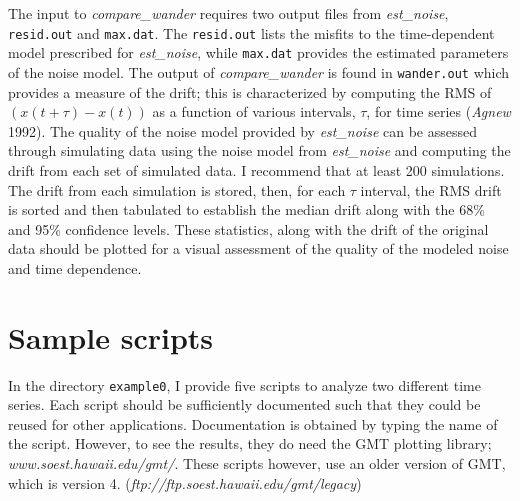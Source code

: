 \documentclass[12pt]{amsart}
\begin{document}
The input to  \textit{compare\_wander} requires two output files from \textit{est\_noise}, \texttt{resid.out} and \texttt{max.dat}.
The \texttt{resid.out} lists the misfits to the time-dependent model prescribed for \textit{est\_noise}, while \texttt{max.dat}
provides the estimated parameters of the noise model.  The output of \textit{compare\_wander} is found in \texttt{wander.out}
which provides a measure of the drift; this is characterized by computing the RMS of $(x(t+{\tau})-x(t))$ as a function of various
intervals, ${\tau}$, for  time series (\textit{Agnew} 1992). The quality of the noise model provided by \textit{est\_noise} can be assessed through
simulating data using the noise model from \textit{est\_noise} and computing the drift from each set of simulated data.
I recommend that at least 200 simulations.  The drift from each simulation is stored, then, for each ${\tau}$ interval,
the RMS drift is sorted and then tabulated to establish the median drift along with the 68\% and 95\% confidence levels.
These statistics, along with the drift of the original data should be plotted for a visual assessment of the quality of the
modeled noise and time dependence.


\section{Sample scripts}

In the directory \texttt{example0}, I provide five scripts to analyze two different time series. Each script should be
sufficiently documented such that they could be reused for other applications. Documentation is obtained by
typing the name of the script. However, to see the results,
they do need the GMT plotting library; \textit{www.soest.hawaii.edu/gmt/}. These scripts however, use an older version
of GMT, which is version 4. (\textit{ftp://ftp.soest.hawaii.edu/gmt/legacy})
\end{document}
